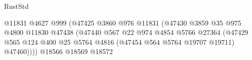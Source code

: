 \begin{lexlean}{RustStd}
\begin{coremodule}
                                                            @11831
                                                            @4627
                                                            @999
                                                            (@47425
                                                              @3860
                                                              @976
                                                              @11831
                                                              (@47430
                                                                @3859
                                                                @35
                                                                @975
                                                                @4800
                                                                @11830
                                                                @47438
                                                                (@47440
                                                                  @567
                                                                  @22
                                                                  @974
                                                                  @4854
                                                                  @5766
                                                                  @27364
                                                                  (@47429
                                                                    @565
                                                                    @124
                                                                    @400
                                                                    @25
                                                                    @5764
                                                                    @4816
                                                                    (@47454
                                                                      @564
                                                                      @5764
                                                                      @19707
                                                                      @19711)
                                                                    @47460))))
                                                            @18566
                                                            @18569
                                                            @18572

\end{coremodule}
\end{lexlean}
